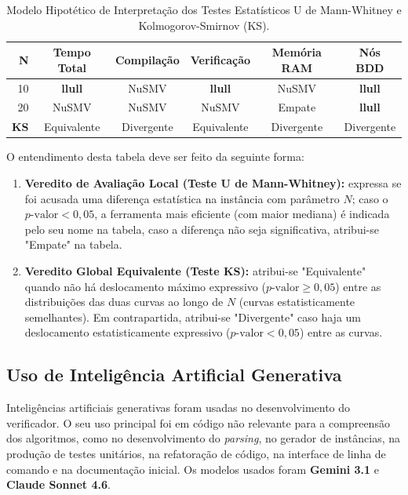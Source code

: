 \documentclass[cic,tc]{infufrgs}
\begin{document}
	\begin{table}[htbp]
		\centering
		\caption{Modelo Hipotético de Interpretação dos Testes Estatísticos U de Mann-Whitney e Kolmogorov-Smirnov (KS).}
		\label{tab:exemplo_interpretacao_estatistica}
		\small
		\begin{tabular}{rccccc}
			\toprule
			\textbf{N} & \textbf{Tempo Total} & \textbf{Compilação} & \textbf{Verificação} & \textbf{Memória RAM} & \textbf{Nós BDD} \\
			\midrule
			10 & \textbf{llull} & NuSMV & \textbf{llull} & NuSMV & \textbf{llull} \\
			20 & NuSMV          & NuSMV & NuSMV          & Empate & \textbf{llull} \\
			\midrule
			\textbf{KS} & Equivalente & Divergente & Equivalente & Divergente & Divergente \\
			\bottomrule
		\end{tabular}
	\end{table}
	
	O entendimento desta tabela deve ser feito da seguinte forma:
	
	\begin{enumerate}
		\item \textbf{Veredito de Avaliação Local (Teste U de Mann-Whitney):} expressa se foi acusada uma diferença estatística na instância com parâmetro $N$; caso o $p\text{-valor} < 0,05$, a ferramenta mais eficiente (com maior mediana) é indicada pelo seu nome na tabela, caso a diferença não seja significativa, atribui-se "Empate" na tabela.
		\item \textbf{Veredito Global Equivalente (Teste KS):} atribui-se "Equivalente" quando não há deslocamento máximo expressivo ($p\text{-valor} \ge 0,05$) entre as distribuições das duas curvas ao longo de $N$ (curvas estatisticamente semelhantes). Em contrapartida, atribui-se "Divergente" caso haja um deslocamento estatisticamente expressivo ($p\text{-valor} < 0,05$) entre as curvas. 
	\end{enumerate}
	
	\subsection{Uso de Inteligência Artificial Generativa}
	Inteligências artificiais generativas foram usadas no desenvolvimento do verificador. O seu uso principal foi em código não relevante para a compreensão dos algoritmos, como no desenvolvimento do \textit{parsing}, no gerador de instâncias, na produção de testes unitários, na refatoração de código, na interface de linha de comando e na documentação inicial. Os modelos usados foram \textbf{Gemini 3.1} e \textbf{Claude Sonnet 4.6}.
	
\end{document}
